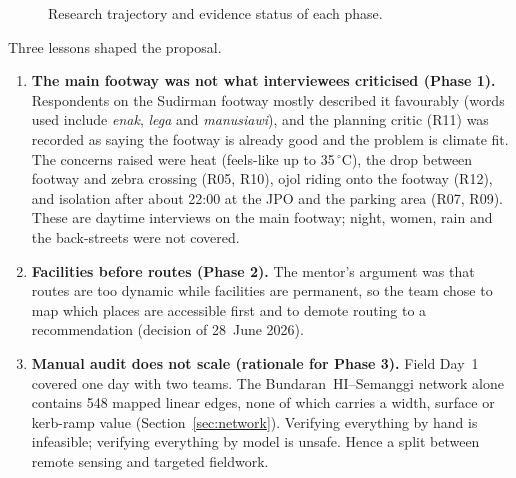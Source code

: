 \documentclass[11pt,a4paper]{article}
\begin{document}
\begin{figure}[H]
\caption{Research trajectory and evidence status of each phase.}
\label{fig:trajectory}
\end{figure}

Three lessons shaped the proposal.

\begin{enumerate}
  \item \textbf{The main footway was not what interviewees criticised (Phase 1).} Respondents on the
    Sudirman footway mostly described it favourably (words used include \emph{enak}, \emph{lega} and
    \emph{manusiawi}), and the planning critic (R11) was recorded as saying the footway is already
    good and the problem is climate fit. The concerns raised were
    heat (feels-like up to 35\,$^\circ$C), the drop between footway and zebra crossing (R05, R10),
    ojol riding onto the footway (R12), and isolation after about 22:00 at the JPO and the parking
    area (R07, R09). These are daytime interviews on the main footway; night, women, rain and the
    back-streets were not covered.
  \item \textbf{Facilities before routes (Phase 2).} The mentor's argument was that routes are too
    dynamic while facilities are permanent, so the team chose to map which places are accessible
    first and to demote routing to a recommendation (decision of 28~June 2026).
  \item \textbf{Manual audit does not scale (rationale for Phase 3).} Field Day~1 covered one day
    with two teams. The Bundaran~HI--Semanggi network alone contains 548 mapped linear edges, none of
    which carries a width, surface or kerb-ramp value (Section~\ref{sec:network}). Verifying
    everything by hand is infeasible; verifying everything by model is unsafe. Hence a split
    between remote sensing and targeted fieldwork.
\end{enumerate}
\end{document}
